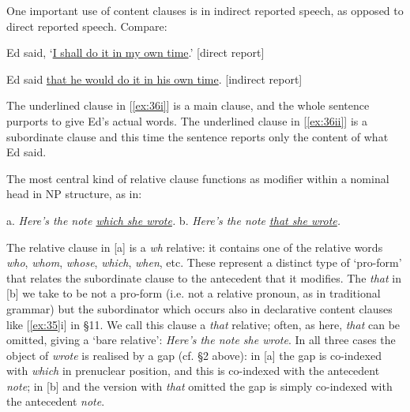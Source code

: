 One important use of content clauses is in {indirect reported speech}, as opposed to {direct reported speech}. Compare:
\begin{examples}
\item \label{ex:36}
    \begin{examples}
        \item \label{ex:36i} Ed said, `\uline{I shall do it in my own time}.' \hfill \textnormal{[direct report]}
        \item \label{ex:36ii} Ed said \uline{that he would do it in his own time}. \hfill \textnormal{[indirect report]}
    \end{examples}
\end{examples}
The underlined clause in [\ref{ex:36i}] is a main clause, and the whole sentence purports to give Ed's actual words. The underlined clause in [\ref{ex:36ii}] is a subordinate clause and this time the sentence reports only the content of what Ed said.


The most central kind of relative clause functions as modifier within a nominal head in NP structure, as in:
\begin{examples}
\item \label{ex:37}
        a. \textit{Here's \ob the note \uline{which she wrote}\cb.}\hspace{3em}
        b. \textit{Here's \ob the note \uline{that she wrote}\cb.}
\end{examples}
The relative clause in [a] is a {\textit{wh} relative}: it contains one of the relative words \textit{who}, \textit{whom}, \textit{whose}, \textit{which}, \textit{when}, etc. These represent a distinct type of `pro-form' that relates the subordinate clause to the antecedent that it modifies. The \textit{that} in [b] we take to be not a pro-form (i.e. not a relative pronoun, as in traditional grammar) but the subordinator which occurs also in declarative content clauses like [\ref{ex:35}i] in §11. We call this clause a {\textit{that} relative}; often, as here, \textit{that} can be omitted, giving a `{bare relative}': \textit{Here's \ob the note she wrote\cb}. In all three cases the object of \textit{wrote} is realised by a gap (cf. §2 above): in [a] the gap is co-indexed with \textit{which} in prenuclear position, and this is co-indexed with the antecedent \textit{note}; in [b] and the version with \textit{that} omitted the gap is simply co-indexed with the antecedent \textit{note}.

